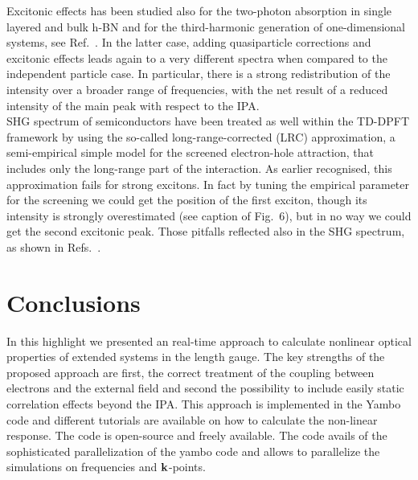 Excitonic effects has been studied also for the two-photon absorption in single layered and bulk h-BN and for the third-harmonic generation of one-dimensional systems, see Ref.~. In the latter case, adding quasiparticle corrections and excitonic effects leads again to a very different spectra when compared to the independent particle case. In particular, there is a strong redistribution of the intensity over a broader range of frequencies, with the net result of a reduced intensity of the main peak with respect to the IPA.\\ 
SHG spectrum of semiconductors have been treated as well within the TD-DPFT framework\cite{PhysRevB.82.235201} by using the so-called long-range-corrected (LRC) approximation,\cite{LRC} a semi-empirical simple model for the screened electron-hole attraction, that includes only the long-range part of the interaction. %
As earlier recognised, this approximation fails for strong excitons. In fact by tuning the empirical parameter for the screening we could get the position of the first exciton, though its intensity is strongly overestimated (see caption of Fig.~6), but in no way we could get the second excitonic peak. Those pitfalls reflected also in the SHG spectrum, as shown in Refs.~\cite{gruningtddf1,gruningtddf2}. 

\section{Conclusions}\label{conclusion}                                        
In this highlight we presented an \ai real-time approach to calculate nonlinear optical properties of extended systems in the length gauge. The key strengths of the proposed approach are first, the correct treatment of the coupling between electrons and the external field and second the possibility to include easily static correlation effects beyond the IPA.
This approach is implemented in the Yambo code\cite{yambo} and different tutorials are available on how to calculate the non-linear response.\cite{yambo_wiki} The code is open-source and freely available.%
The code avails of the sophisticated parallelization of the yambo code\cite{yambo} and allows to parallelize the simulations on frequencies and ${\bf k}$-points. 
%
%

